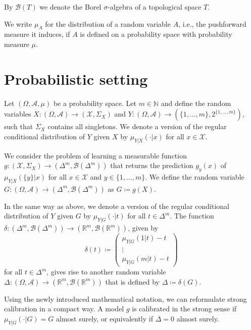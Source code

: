 \documentclass{article}
\begin{document}
By $\mathcal{B}(T)$ we denote the Borel $\sigma$-algebra of a topological space
$T$.

We write $\mu_A$ for the distribution of a random variable $A$, i.e., the
pushforward measure it induces, if $A$ is defined on a probability space with
probability measure $\mu$.

\section{Probabilistic setting}

Let $(\Omega, \mathcal{A}, \mu)$ be a probability space. Let $m \in \mathbb{N}$
and define the random variables
$X \colon (\Omega, \mathcal{A}) \to (\mathcal{X}, \Sigma_X)$ and
$Y \colon (\Omega, \mathcal{A}) \to (\{1,\ldots,m\}, 2^{\{1,\ldots,m\}})$, such that
$\Sigma_X$ contains all singletons. We denote a version of the regular
conditional distribution of $Y$ given $X$ by $\mu_{Y|X}(\cdot|x)$ for all
$x \in \mathcal{X}$.

We consider the problem of learning a measurable function
$g \colon (\mathcal{X}, \Sigma_X) \to (\Delta^m, \mathcal{B}(\Delta^m))$ that
returns the prediction $g_y(x)$ of $\mu_{Y|X}(\{y\}|x)$ for all $x \in \mathcal{X}$
and $y \in \{1,\ldots,m\}$. We define the random variable
$G \colon (\Omega, \mathcal{A}) \to (\Delta^m, \mathcal{B}(\Delta^m))$ as $G \coloneqq g(X)$.

In the same way as above, we denote a version of the regular conditional
distribution of $Y$ given $G$ by $\mu_{Y|G}(\cdot|t)$ for all $t \in \Delta^m$.
The function
$\delta \colon (\Delta^m, \mathcal{B}(\Delta^m)) \to (\mathbb{R}^m, \mathcal{B}(\mathbb{R}^m))$,
given by
\begin{equation*}
  \delta(t) \coloneqq \begin{pmatrix}
    \mu_{Y|G}(1|t) - t \\
    \vdots \\
    \mu_{Y|G}(m|t) - t
  \end{pmatrix}
\end{equation*}
for all $t \in \Delta^m$, gives rise to another random variable
$\Delta \colon (\Omega, \mathcal{A}) \to (\mathbb{R}^m, \mathcal{B}(\mathbb{R}^m))$
that is defined by $\Delta \coloneqq \delta(G)$.

Using the newly introduced mathematical notation, we can reformulate strong
calibration in a compact way. A model $g$ is calibrated in the strong sense if
$\mu_{Y|G}(\cdot|G) = G$ almost surely, or equivalently if $\Delta = 0$ almost surely.
\end{document}
